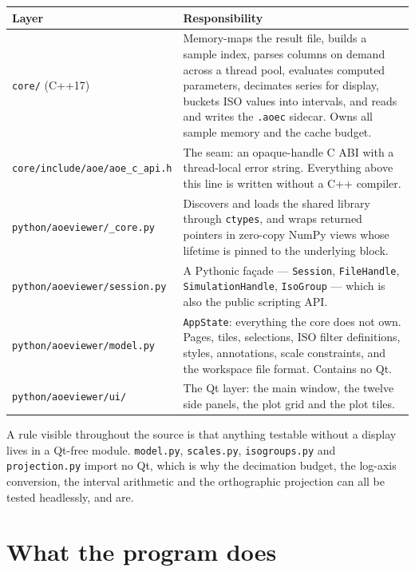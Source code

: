 \documentclass[11pt,a4paper,oneside]{report}
\newcommand{\code}[1]{\texttt{#1}}
\begin{document}
\begin{center}
\small
\begin{tabular}{@{}p{}p{}@{}}
\toprule
\textbf{Layer} & \textbf{Responsibility} \\
\midrule
\code{core/} (C++17) &
  Memory-maps the result file, builds a sample index, parses columns on demand
  across a thread pool, evaluates computed parameters, decimates series for
  display, buckets ISO values into intervals, and reads and writes the
  \code{.aoec} sidecar. Owns all sample memory and the cache budget. \\
\addlinespace
\code{core/include/aoe/aoe\_c\_api.h} &
  The seam: an opaque-handle C ABI with a thread-local error string. Everything
  above this line is written without a C++ compiler. \\
\addlinespace
\code{python/aoeviewer/\_core.py} &
  Discovers and loads the shared library through \code{ctypes}, and wraps
  returned pointers in zero-copy NumPy views whose lifetime is pinned to the
  underlying block. \\
\addlinespace
\code{python/aoeviewer/session.py} &
  A Pythonic fa\c{c}ade --- \code{Session}, \code{FileHandle},
  \code{SimulationHandle}, \code{IsoGroup} --- which is also the public
  scripting API. \\
\addlinespace
\code{python/aoeviewer/model.py} &
  \code{AppState}: everything the core does not own. Pages, tiles, selections,
  ISO filter definitions, styles, annotations, scale constraints, and the
  workspace file format. Contains no Qt. \\
\addlinespace
\code{python/aoeviewer/ui/} &
  The Qt layer: the main window, the twelve side panels, the plot grid and the
  plot tiles. \\
\bottomrule
\end{tabular}
\end{center}

A rule visible throughout the source is that anything testable without a
display lives in a Qt-free module. \code{model.py}, \code{scales.py},
\code{isogroups.py} and \code{projection.py} import no Qt, which is why the
decimation budget, the log-axis conversion, the interval arithmetic and the
orthographic projection can all be tested headlessly, and are.

\section{What the program does}
\end{document}
